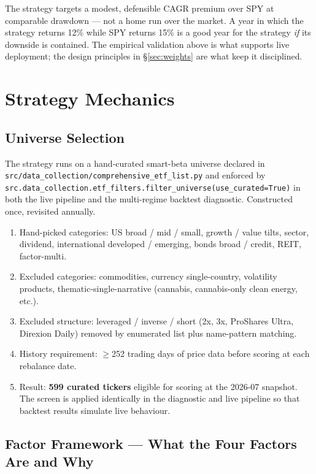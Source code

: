 \documentclass[11pt,a4paper]{article}
\begin{document}
The strategy targets a modest, defensible CAGR premium over SPY at comparable drawdown --- not a home run over the market. A year in which the strategy returns 12\% while SPY returns 15\% is a good year for the strategy \emph{if} its downside is contained. The empirical validation above is what supports live deployment; the design principles in \S\ref{sec:weights} are what keep it disciplined.

\section{Strategy Mechanics}
\label{sec:mechanics}

\subsection{Universe Selection}

The strategy runs on a hand-curated smart-beta universe declared in \texttt{src/data\_collection/comprehensive\_etf\_list.py} and enforced by \texttt{src.data\_collection.etf\_filters.filter\_universe(use\_curated=True)} in both the live pipeline and the multi-regime backtest diagnostic. Constructed once, revisited annually.

\begin{enumerate}[noitemsep]
    \item Hand-picked categories: US broad / mid / small, growth / value tilts, sector, dividend, international developed / emerging, bonds broad / credit, REIT, factor-multi.
    \item Excluded categories: commodities, currency single-country, volatility products, thematic-single-narrative (cannabis, cannabis-only clean energy, etc.).
    \item Excluded structure: leveraged / inverse / short (2x, 3x, ProShares Ultra, Direxion Daily) removed by enumerated list plus name-pattern matching.
    \item History requirement: $\geq$252 trading days of price data before scoring at each rebalance date.
    \item Result: \textbf{599 curated tickers} eligible for scoring at the 2026-07 snapshot. The screen is applied identically in the diagnostic and live pipeline so that backtest results simulate live behaviour.
\end{enumerate}

\subsection{Factor Framework --- What the Four Factors Are and Why}
\end{document}
